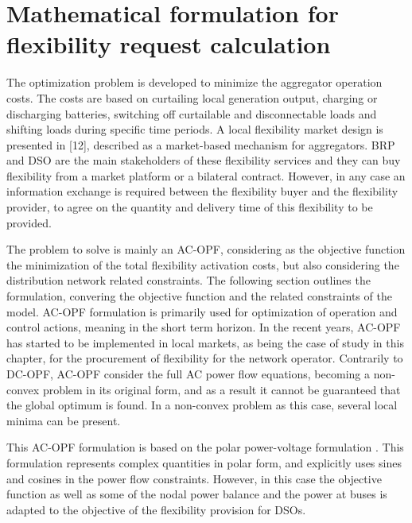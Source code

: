 \section{Mathematical formulation for flexibility request calculation}
The optimization problem is developed to minimize the aggregator operation costs. The costs are based on curtailing local generation output, charging or discharging batteries, switching off curtailable and disconnectable loads and shifting loads during specific time periods. A local flexibility market design is presented in [12], described as a market-based mechanism for aggregators. BRP and DSO are the main stakeholders of these flexibility services and they can buy flexibility from a market platform or a bilateral contract. However, in any case an information exchange is required between the flexibility buyer and the flexibility provider, to agree on the quantity and delivery time of this flexibility to be provided. 

The problem to solve is mainly an AC-OPF, considering as the objective function the minimization of the total flexibility activation costs, but also considering the distribution network related constraints. The following section outlines the formulation, convering the objective function and the related constraints of the model. AC-OPF formulation is primarily used for optimization of operation and control actions, meaning in the short term horizon. In the recent years, AC-OPF has started to be implemented in local markets, as being the case of study in this chapter, for the procurement of flexibility for the network operator. Contrarily to DC-OPF, AC-OPF consider the full AC power flow equations, becoming a non-convex problem in its original form, and as a result it cannot be guaranteed that the global optimum is found. In a non-convex problem as this case, several local minima can be present. 

This AC-OPF formulation is based  on the polar power-voltage formulation \cite{OPF_Formulation}. This formulation represents complex quantities in polar form, and explicitly uses sines and cosines in the power flow constraints. However, in this case the objective function as well as some of the nodal power balance and the power at buses is adapted to the objective of the flexibility provision for DSOs.

